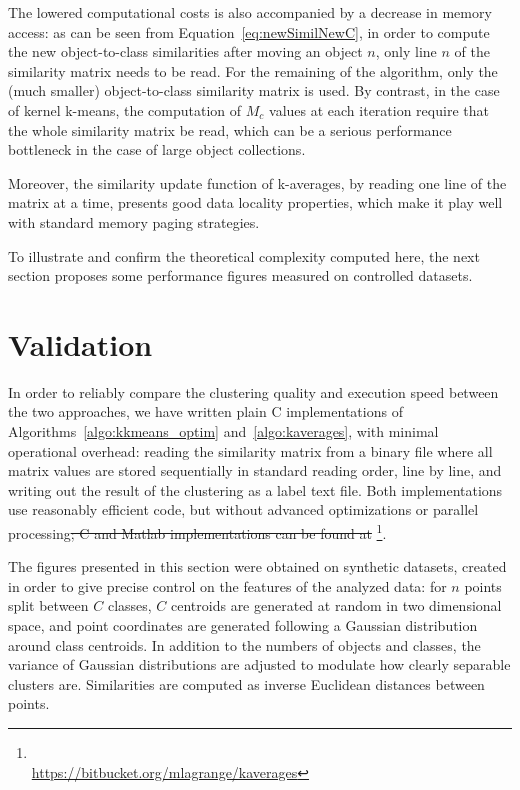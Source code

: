 \documentclass[natbib,smallextended]{svjour3}
\providecommand{\DIFaddtex}[1]{{\protect\color{blue}\uwave{#1}}} %
\providecommand{\DIFdeltex}[1]{{\protect\color{red}\sout{#1}}}                      %
\providecommand{\DIFaddbegin}{} %
\providecommand{\DIFaddend}{} %
\providecommand{\DIFdelbegin}{} %
\providecommand{\DIFdelend}{} %
\providecommand{\DIFadd}[1]{\texorpdfstring{\DIFaddtex{#1}}{#1}} %
\providecommand{\DIFdel}[1]{\texorpdfstring{\DIFdeltex{#1}}{}} %
\begin{document}
The lowered computational costs is also accompanied by a decrease in memory access: as can be seen from Equation~\ref{eq:newSimilNewC}, in order to compute the new object-to-class similarities after moving an object $n$, only line $n$ of the similarity matrix needs to be read. For the remaining of the algorithm, only the (much smaller) object-to-class similarity matrix is used. By contrast, in the case of kernel k-means, the computation of $M_c$ values at each iteration require that the whole similarity matrix be read, which can be a serious performance bottleneck in the case of large object collections.

Moreover, the similarity update function of k-averages, by reading one line of the matrix at a time, presents good data locality properties, which make it play well with standard memory paging strategies.

To illustrate and confirm the theoretical complexity computed here, the next section proposes some performance figures measured on controlled datasets.

\section{Validation}
\label{sec:validation}

In order to reliably compare the clustering quality and execution speed between the two approaches, we have written plain C implementations of Algorithms~\ref{algo:kkmeans_optim} and~\ref{algo:kaverages}, with minimal operational overhead: reading the similarity matrix from a binary file where all matrix values are stored sequentially in standard reading order, line by line, and writing out the result of the clustering as a label text file. Both implementations use reasonably efficient code, but without advanced optimizations or parallel processing\DIFdelbegin \DIFdel{; C and Matlab implementations can be found at}%
\DIFdelend \DIFaddbegin \footnote{\DIFadd{The C and Matlab implementations can be found at}\\ \url{https://bitbucket.org/mlagrange/kaverages}\DIFadd{.}}\DIFaddend .	%

The figures presented in this section were obtained on synthetic datasets, created in order to give precise control on the features of the analyzed data: for $n$ points split between $C$ classes, $C$ centroids are generated at random in two dimensional space, and point coordinates are generated following a Gaussian distribution around class centroids. In addition to the numbers of objects and classes, the variance of Gaussian distributions are adjusted to modulate how clearly separable clusters are. Similarities are computed as inverse Euclidean distances between points. %
\end{document}
